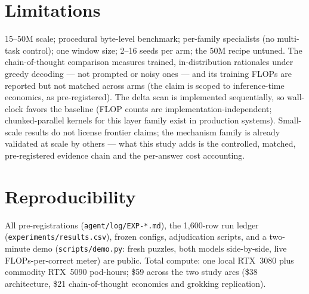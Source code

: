 \documentclass[10pt]{article}
\begin{document}
\section{Limitations}

15--50M scale; procedural byte-level benchmark; per-family specialists (no
multi-task control); one window size; 2--16 seeds per arm; the 50M recipe
untuned. The chain-of-thought comparison measures trained, in-distribution
rationales under greedy decoding --- not prompted or noisy ones --- and its
training FLOPs are reported but not matched across arms (the claim is scoped
to inference-time economics, as pre-registered). The delta scan is implemented
sequentially, so wall-clock favors the baseline (FLOP counts are
implementation-independent; chunked-parallel kernels for this layer family
exist in production systems). Small-scale results do not license frontier
claims; the mechanism family is already validated at scale by others --- what
this study adds is the controlled, matched, pre-registered evidence chain and
the per-answer cost accounting.

\section{Reproducibility}

All pre-registrations (\texttt{agent/log/EXP-*.md}), the 1{,}600-row run
ledger (\texttt{experiments/results.csv}), frozen configs, adjudication
scripts, and a two-minute demo (\texttt{scripts/demo.py}: fresh puzzles, both
models side-by-side, live FLOPs-per-correct meter) are public. Total compute:
one local RTX~3080 plus commodity RTX~5090 pod-hours; \${}59 across the two
study arcs (\${}38 architecture, \${}21 chain-of-thought economics and
grokking replication).

\vspace{2pt}
\end{document}
